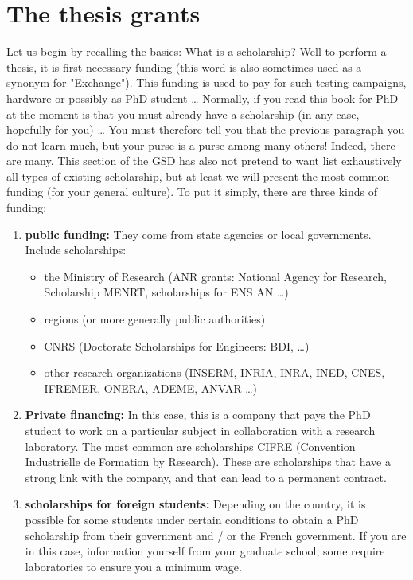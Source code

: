 \section{The thesis grants}
Let us begin by recalling the basics: What is a scholarship?
Well to perform a thesis, it is first necessary funding (this word is also sometimes used as a synonym for "Exchange").
This funding is used to pay for such testing campaigns, hardware or possibly as PhD student \dots
Normally, if you read this book for PhD at the moment is that you must already have a scholarship (in any case, hopefully for you) \dots
You must therefore tell you that the previous paragraph you do not learn much, but your purse is a purse among many others!
Indeed, there are many.
This section of the GSD has also not pretend to want list exhaustively all types of existing scholarship, but at least we will present the most common funding (for your general culture).
To put it simply, there are three kinds of funding:
\begin{enumerate}
  \item \textbf{public funding:} They come from state agencies or local governments. Include scholarships:
  \begin{itemize}
    \item the Ministry of Research (ANR grants: National Agency for Research, Scholarship MENRT, scholarships for ENS AN \dots)
    \item regions (or more generally public authorities)
    \item CNRS (Doctorate Scholarships for Engineers: BDI, \dots)
    \item other research organizations (INSERM, INRIA, INRA, INED, CNES, IFREMER, ONERA, ADEME, ANVAR \dots)
  \end{itemize}
  \item \textbf{Private financing:} In this case, this is a company that pays the PhD student to work on a particular subject in collaboration with a research laboratory. The most common are scholarships CIFRE (Convention Industrielle de Formation by Research). These are scholarships that have a strong link with the company, and that can lead to a permanent contract.
  \item \textbf{scholarships for foreign students:} Depending on the country, it is possible for some students under certain conditions to obtain a PhD scholarship from their government and / or the French government. If you are in this case, information yourself from your graduate school, some require laboratories to ensure you a minimum wage.
\end{enumerate}


